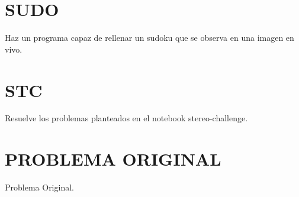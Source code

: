\documentclass[a4paper]{article} %
\begin{document}
\newpage


\section{SUDO}
\bigskip

\begin{tcolorbox}[breakable,notitle,boxrule=0pt,colback=lightgray,colframe=lightgray]
	Haz un programa capaz de rellenar un sudoku que se observa en una imagen en vivo.
\end{tcolorbox}

\newpage


\section{STC}
\bigskip

\begin{tcolorbox}[breakable,notitle,boxrule=0pt,colback=lightgray,colframe=lightgray]
	Resuelve los problemas planteados en el notebook stereo-challenge.
\end{tcolorbox}

\newpage


\section{PROBLEMA ORIGINAL}
\bigskip

\begin{tcolorbox}[breakable,notitle,boxrule=0pt,colback=lightgray,colframe=lightgray]
	Problema Original.
\end{tcolorbox}

\newpage





\end{document}
